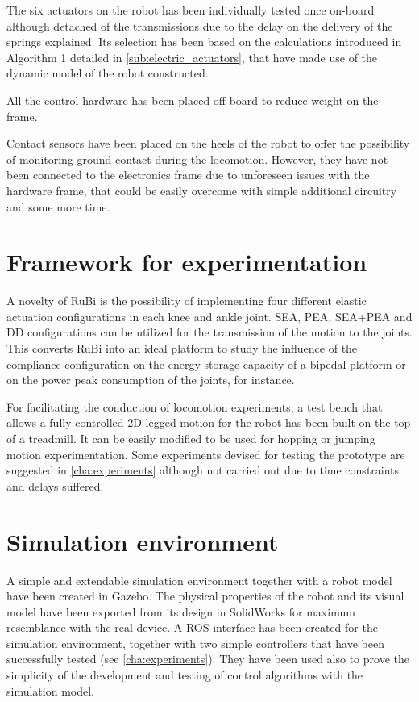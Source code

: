 The six actuators on the robot has been individually tested once on-board although detached of the transmissions due to the delay on the delivery of the springs explained.
Its selection has been based on the calculations introduced in Algorithm 1 detailed in \ref{sub:electric_actuators}, that have made use of the dynamic model of the robot constructed.

All the control hardware has been placed off-board to reduce weight on the frame.

Contact sensors have been placed on the heels of the robot to offer the possibility of monitoring ground contact during the locomotion.
However, they have not been connected to the electronics frame due to unforeseen issues with the hardware frame, that could be easily overcome with simple additional circuitry and some more time.


\section{Framework for experimentation} %
\label{sec:framework_for_experimentation}
A novelty of RuBi is the possibility of implementing four different elastic actuation configurations in each knee and ankle joint.
SEA, PEA, SEA+PEA and DD configurations can be utilized for the transmission of the motion to the joints.
This converts RuBi into an ideal platform to study the influence of the compliance configuration on the energy storage capacity of a bipedal platform or on the power peak consumption of the joints, for instance.

For facilitating the conduction of locomotion experiments, a test bench that allows a fully controlled 2D legged motion for the robot has been built on the top of a treadmill.
It can be easily modified to be used for hopping or jumping motion experimentation.
Some experiments devised for testing the prototype are suggested in \ref{cha:experiments} although not carried out due to time constraints and delays suffered.

\section{Simulation environment} %
\label{sec:simulation_environment}
A simple and extendable simulation environment together with a robot model have been created in Gazebo.
The physical properties of the robot and its visual model have been exported from its design in SolidWorks for maximum resemblance with the real device.
A ROS interface has been created for the simulation environment, together with two simple controllers that have been successfully tested (see \ref{cha:experiments}).
They have been used also to prove the simplicity of the development and testing of control algorithms with the simulation model.

